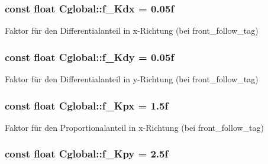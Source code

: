 \hypertarget{class_cglobal_a898e02a3650a5e6445aca8411ed79194}{
\subsubsection[{f\_\-Kdx}]{\setlength{\rightskip}{0pt plus 5cm}const float {\bf Cglobal::f\_\-Kdx} = 0.05f}}
\label{class_cglobal_a898e02a3650a5e6445aca8411ed79194}


Faktor für den Differentialanteil in x-\/Richtung (bei front\_\-follow\_\-tag) 

\hypertarget{class_cglobal_a8ff8f3e1711db988e5a936af1d5f2d42}{
\subsubsection[{f\_\-Kdy}]{\setlength{\rightskip}{0pt plus 5cm}const float {\bf Cglobal::f\_\-Kdy} = 0.05f}}
\label{class_cglobal_a8ff8f3e1711db988e5a936af1d5f2d42}


Faktor für den Differentialanteil in y-\/Richtung (bei front\_\-follow\_\-tag) 

\hypertarget{class_cglobal_ae94b927d5fee8ac20eb04add78006959}{
\subsubsection[{f\_\-Kpx}]{\setlength{\rightskip}{0pt plus 5cm}const float {\bf Cglobal::f\_\-Kpx} = 1.5f}}
\label{class_cglobal_ae94b927d5fee8ac20eb04add78006959}


Faktor für den Proportionalanteil in x-\/Richtung (bei front\_\-follow\_\-tag) 

\hypertarget{class_cglobal_a06a9f451633a82b68760360037b53f64}{
\subsubsection[{f\_\-Kpy}]{\setlength{\rightskip}{0pt plus 5cm}const float {\bf Cglobal::f\_\-Kpy} = 2.5f}}
\label{class_cglobal_a06a9f451633a82b68760360037b53f64}


